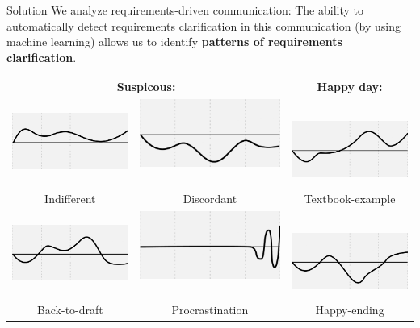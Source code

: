\documentclass[final]{beamer} %
\newcommand{\marker}[1]{\textbf{\color{knaccentcolor1} #1}}
\begin{document}
\begin{frame}{}
\begin{columns}[t]
\begin{column}{.45\linewidth}
    
    \begin{block}{Solution}
We analyze requirements-driven communication: The ability to automatically detect requirements clarification in this communication (by using machine learning) allows us to identify \marker{patterns of requirements clarification}.

\begin{center}\footnotesize
\begin{tabular}{cc|c}

\multicolumn{2}{c|}{\marker{Suspicous:}} & \marker{Happy day:}\tabularnewline
\includegraphics[width=0.25\columnwidth]{img/pattern-indifferent} &
\includegraphics[width=0.25\columnwidth]{img/pattern-discordant} ~ ~&
~ \includegraphics[width=0.25\columnwidth]{img/pattern-textbook-example}\tabularnewline
Indifferent & Discordant & Textbook-example \tabularnewline
\includegraphics[width=0.25\columnwidth]{img/pattern-back-to-draft} &
\includegraphics[width=0.25\columnwidth]{img/pattern-procrastination} ~ ~ & 
~ \includegraphics[width=0.25\columnwidth]{img/pattern-happy-ending}
\tabularnewline
Back-to-draft & Procrastination & Happy-ending
\end{tabular}
\end{center}
%
%
%
\end{block}
    

\end{column}
\end{columns}
\end{frame}
\end{document}
